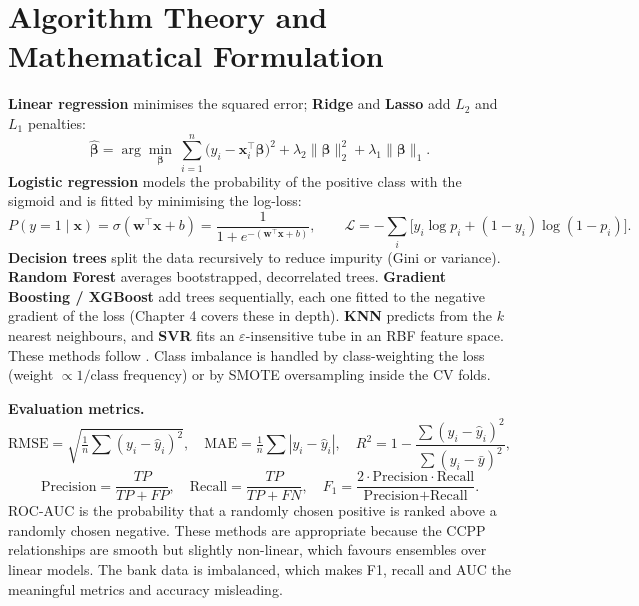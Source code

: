 \section{Algorithm Theory and Mathematical Formulation}
\textbf{Linear regression} minimises the squared error; \textbf{Ridge} and \textbf{Lasso} add $L_2$ and $L_1$ penalties:
\begin{equation}
\hat{\boldsymbol\beta}=\arg\min_{\boldsymbol\beta}\ \sum_{i=1}^{n}\big(y_i-\mathbf{x}_i^\top\boldsymbol\beta\big)^2
+\lambda_2\lVert\boldsymbol\beta\rVert_2^2+\lambda_1\lVert\boldsymbol\beta\rVert_1 .
\end{equation}
\textbf{Logistic regression} models the probability of the positive class with the sigmoid and is fitted by minimising
the log-loss:
\begin{equation}
P(y=1\mid\mathbf{x})=\sigma(\mathbf{w}^\top\mathbf{x}+b)=\frac{1}{1+e^{-(\mathbf{w}^\top\mathbf{x}+b)}},\qquad
\mathcal{L}=-\sum_i\big[y_i\log p_i+(1-y_i)\log(1-p_i)\big].
\end{equation}
\textbf{Decision trees} split the data recursively to reduce impurity (Gini or variance). \textbf{Random Forest} averages
bootstrapped, decorrelated trees. \textbf{Gradient Boosting / XGBoost} \cite{friedman,xgboost} add trees sequentially, each one fitted to the
negative gradient of the loss (Chapter 4 covers these in depth). \textbf{KNN} predicts from the $k$ nearest neighbours,
and \textbf{SVR} fits an $\varepsilon$-insensitive tube in an RBF feature space. These methods follow \cite{esl,sklearn}. Class imbalance is handled by
class-weighting the loss (weight $\propto 1/\text{class frequency}$) or by SMOTE oversampling \cite{chawla} inside the CV folds.

\textbf{Evaluation metrics.}
\begin{equation}
\text{RMSE}=\sqrt{\tfrac{1}{n}\sum(y_i-\hat y_i)^2},\quad
\text{MAE}=\tfrac{1}{n}\sum|y_i-\hat y_i|,\quad
R^2=1-\frac{\sum(y_i-\hat y_i)^2}{\sum(y_i-\bar y)^2},
\end{equation}
\begin{equation}
\text{Precision}=\frac{TP}{TP+FP},\quad \text{Recall}=\frac{TP}{TP+FN},\quad
F_1=\frac{2\cdot\text{Precision}\cdot\text{Recall}}{\text{Precision}+\text{Recall}} .
\end{equation}
ROC-AUC is the probability that a randomly chosen positive is ranked above a randomly chosen negative. These methods are
appropriate because the CCPP relationships are smooth but slightly non-linear, which favours ensembles over linear
models. The bank data is imbalanced, which makes F1, recall and AUC the meaningful metrics and accuracy misleading.

